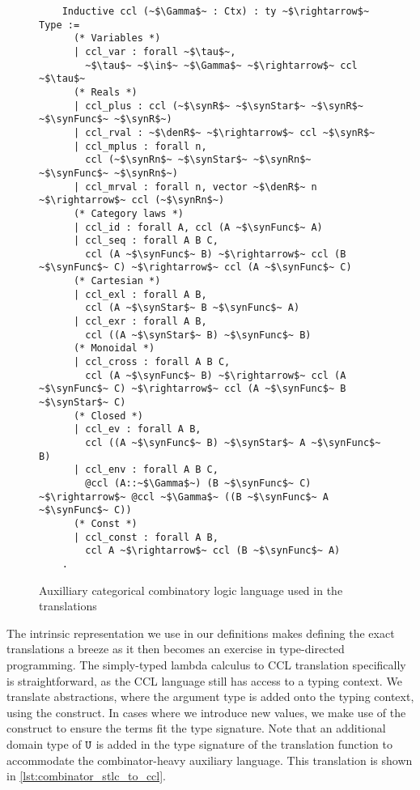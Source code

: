   \begin{figure}[]
    \centering
    \begin{verbatim}
    Inductive ccl (~$\Gamma$~ : Ctx) : ty ~$\rightarrow$~ Type :=
      (* Variables *)
      | ccl_var : forall ~$\tau$~,
        ~$\tau$~ ~$\in$~ ~$\Gamma$~ ~$\rightarrow$~ ccl ~$\tau$~
      (* Reals *)
      | ccl_plus : ccl (~$\synR$~ ~$\synStar$~ ~$\synR$~ ~$\synFunc$~ ~$\synR$~)
      | ccl_rval : ~$\denR$~ ~$\rightarrow$~ ccl ~$\synR$~
      | ccl_mplus : forall n,
        ccl (~$\synRn$~ ~$\synStar$~ ~$\synRn$~ ~$\synFunc$~ ~$\synRn$~)
      | ccl_mrval : forall n, vector ~$\denR$~ n ~$\rightarrow$~ ccl (~$\synRn$~)
      (* Category laws *)
      | ccl_id : forall A, ccl (A ~$\synFunc$~ A)
      | ccl_seq : forall A B C,
        ccl (A ~$\synFunc$~ B) ~$\rightarrow$~ ccl (B ~$\synFunc$~ C) ~$\rightarrow$~ ccl (A ~$\synFunc$~ C)
      (* Cartesian *)
      | ccl_exl : forall A B,
        ccl (A ~$\synStar$~ B ~$\synFunc$~ A)
      | ccl_exr : forall A B,
        ccl ((A ~$\synStar$~ B) ~$\synFunc$~ B)
      (* Monoidal *)
      | ccl_cross : forall A B C,
        ccl (A ~$\synFunc$~ B) ~$\rightarrow$~ ccl (A ~$\synFunc$~ C) ~$\rightarrow$~ ccl (A ~$\synFunc$~ B ~$\synStar$~ C)
      (* Closed *)
      | ccl_ev : forall A B,
        ccl ((A ~$\synFunc$~ B) ~$\synStar$~ A ~$\synFunc$~ B)
      | ccl_env : forall A B C,
        @ccl (A::~$\Gamma$~) (B ~$\synFunc$~ C) ~$\rightarrow$~ @ccl ~$\Gamma$~ ((B ~$\synFunc$~ A ~$\synFunc$~ C))
      (* Const *)
      | ccl_const : forall A B,
        ccl A ~$\rightarrow$~ ccl (B ~$\synFunc$~ A)
    .
    \end{verbatim}
    \caption{Auxilliary categorical combinatory logic language used in the translations}
    \label{fig:combinator_ccl_lang}
  \end{figure}

  The intrinsic representation we use in our definitions makes defining the exact translations a breeze as it then becomes an exercise in type-directed programming.
  The simply-typed lambda calculus to CCL translation specifically is straightforward, as the CCL language still has access to a typing context.
  We translate abstractions, where the argument type is added onto the typing context, using the \cclenv{} construct.
  In cases where we introduce new values, we make use of the \cclconst{} construct to ensure the terms fit the type signature.
  Note that an additional domain type of $\texttt{U}$ is added in the type signature of the translation function to accommodate the combinator-heavy auxiliary language.
  This translation is shown in \cref{lst:combinator_stlc_to_ccl}.

